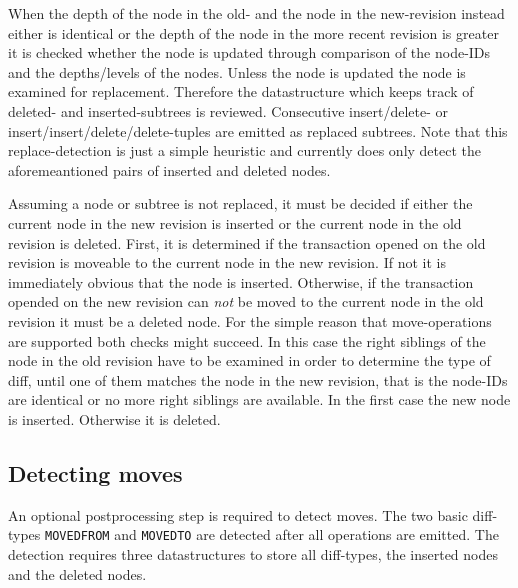 When the depth of the node in the old- and the node in the new-revision instead either is identical or the depth of the node in the more recent revision is greater it is checked whether the node is updated through comparison of the node-IDs and the depths/levels of the nodes. Unless the node is updated the node is examined for replacement. Therefore the datastructure which keeps track of deleted- and inserted-subtrees is reviewed. Consecutive insert/delete- or insert/insert/delete/delete-tuples are emitted as replaced subtrees. Note that this replace-detection is just a simple heuristic and currently does only detect the aforemeantioned pairs of inserted and deleted nodes.%

Assuming a node or subtree is not replaced, it must be decided if either the current node in the new revision is inserted or the current node in the old revision is deleted. First, it is determined if the transaction opened on the old revision is moveable to the current node in the new revision. If not it is immediately obvious that the node is inserted. Otherwise, if the transaction opended on the new revision can \emph{not} be moved to the current node in the old revision it must be a deleted node. For the simple reason that move-operations are supported both checks might succeed. In this case the right siblings of the node in the old revision have to be examined in order to determine the type of diff, until one of them matches the node in the new revision, that is the node-IDs are identical or no more right siblings are available. In the first case the new node is inserted. Otherwise it is deleted.

\subsection{Detecting moves}
An optional postprocessing step is required to detect moves. The two basic diff-types \texttt{MOVEDFROM} and \texttt{MOVEDTO} are detected after all operations are emitted. The detection requires three datastructures to store all diff-types, the inserted nodes and the deleted nodes.


